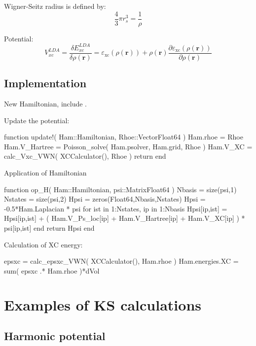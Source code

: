 Wigner-Seitz radius is defined by:
\begin{equation}
\frac{4}{3}\pi r^{3}_{s} = \frac{1}{\rho}
\end{equation}

Potential:
\begin{equation}
V^{LDA}_{xc} = \frac{\delta E^{LDA}_{xc}}{\delta \rho(\mathbf{r})} = 
\varepsilon_{\mathrm{xc}}( \rho(\mathbf{r}) ) + \rho(\mathbf{r})
\frac{\partial \varepsilon_{\mathrm{xc}}( \rho(\mathbf{r}) )}{\partial\rho(\mathbf{r})}
\end{equation}


\subsection{Implementation}

New Hamiltonian, include .

Update the potential:

\begin{juliacode}
function update!( Ham::Hamiltonian, Rhoe::Vector{Float64} )
  Ham.rhoe = Rhoe
  Ham.V_Hartree = Poisson_solve( Ham.psolver, Ham.grid, Rhoe )
  Ham.V_XC = calc_Vxc_VWN( XCCalculator(), Rhoe )
  return
end
\end{juliacode}

Application of Hamiltonian

\begin{juliacode}
function op_H( Ham::Hamiltonian, psi::Matrix{Float64} )
  Nbasis = size(psi,1)
  Nstates = size(psi,2)
  Hpsi = zeros(Float64,Nbasis,Nstates)
  Hpsi = -0.5*Ham.Laplacian * psi
  for ist in 1:Nstates, ip in 1:Nbasis
    Hpsi[ip,ist] = Hpsi[ip,ist] + ( Ham.V_Ps_loc[ip] + Ham.V_Hartree[ip] +
                   Ham.V_XC[ip] ) * psi[ip,ist]
  end
  return Hpsi
end
\end{juliacode}

Calculation of XC energy:
\begin{juliacode}
epsxc = calc_epsxc_VWN( XCCalculator(), Ham.rhoe )
Ham.energies.XC = sum( epsxc .* Ham.rhoe )*dVol
\end{juliacode}

\section{Examples of KS calculations}

\subsection{Harmonic potential}

